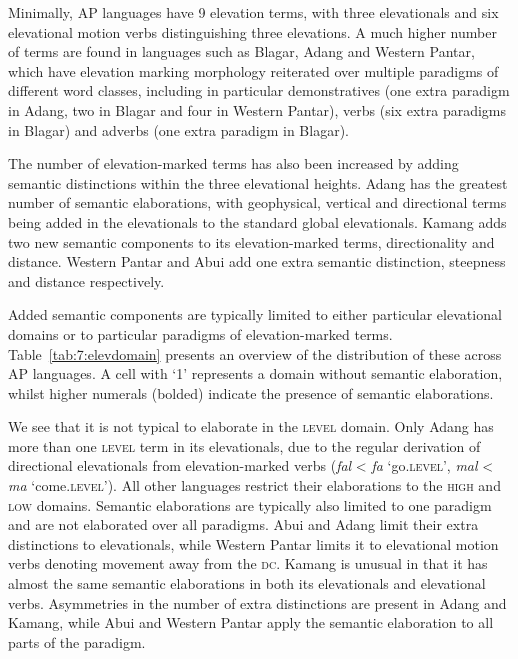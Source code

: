 Minimally, AP languages have 9 elevation terms, with three elevationals and six elevational motion verbs distinguishing three elevations. A much higher number of terms are found in languages such as Blagar, Adang and Western Pantar, which have elevation marking morphology reiterated over multiple paradigms of different word classes, including in particular demonstratives (one extra paradigm in Adang, two in Blagar and four in Western Pantar), verbs (six extra paradigms in Blagar) and adverbs (one extra paradigm in Blagar).

The number of elevation-marked terms has also been increased by adding semantic distinctions within the three elevational heights. Adang has the greatest number of semantic elaborations, with geophysical, vertical and directional terms being added in the elevationals to the standard global elevationals. Kamang adds two new semantic components to its elevation-marked terms, directionality and distance. Western Pantar and Abui add one extra semantic distinction, steepness and distance respectively. 

Added semantic components are typically limited to either particular elevational domains or to particular paradigms of elevation-marked terms. Table~\ref{tab:7:elevdomain} presents an overview of the distribution of these across AP languages. A cell with `1' represents a domain without semantic elaboration, whilst higher numerals (bolded) indicate the presence of semantic elaborations. 

We see that it is not typical to elaborate in the \textsc{level} domain. Only Adang has more than one \textsc{level} term in its elevationals, due to the regular derivation of directional elevationals from elevation-marked verbs (\textit{fal}\textit{{\textepsilon}} {\textless} \textit{fa} `go\textsc{.level',} \textit{mal}\textit{{\textepsilon}} {\textless} \textit{ma}  `come\textsc{.level'}). All other languages restrict their elaborations to the \textsc{high} and \textsc{low} domains. Semantic elaborations are typically also limited to one paradigm and are not elaborated over all paradigms. Abui and Adang limit their extra distinctions to elevationals, while Western Pantar limits it to elevational motion verbs denoting movement away from the \textsc{dc}. Kamang is unusual in that it has almost the same semantic elaborations in both its elevationals and elevational verbs. Asymmetries in the number of extra distinctions are present in Adang and Kamang, while Abui and Western Pantar apply the semantic elaboration to all parts of the paradigm.
 

